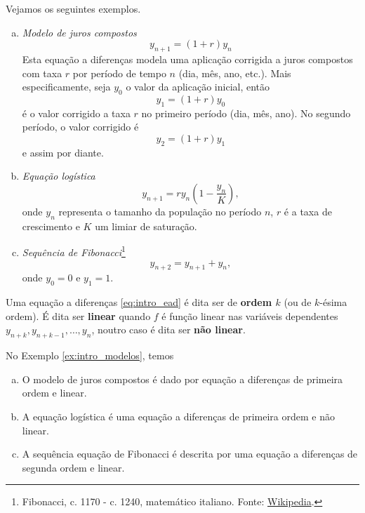 \begin{ex}\label{ex:intro_modelos}
  Vejamos os seguintes exemplos.
  \begin{enumerate}[a)]
  \item \emph{Modelo de juros compostos}
    \begin{equation}
      y_{n+1} = (1+r)y_n
    \end{equation}
    Esta equação a diferenças modela uma aplicação corrigida a juros compostos com taxa $r$ por período de tempo $n$ (dia, mês, ano, etc.). Mais especificamente, seja $y_0$ o valor da aplicação inicial, então
    \begin{equation}
      y_1 = (1+r)y_0
    \end{equation}
    é o valor corrigido a taxa $r$ no primeiro período (dia, mês, ano). No segundo período, o valor corrigido é
    \begin{equation}
      y_2 = (1+r)y_1
    \end{equation}
    e assim por diante.
  \item \emph{Equação logística}
    \begin{equation}
      y_{n+1} = r y_n\left(1 - \frac{y_n}{K}\right),
    \end{equation}
    onde $y_n$ representa o tamanho da população no período $n$, $r$ é a taxa de crescimento e $K$ um limiar de saturação.
  \item \emph{Sequência de Fibonacci}\footnote{Fibonacci, c. 1170 - c. 1240, matemático italiano. Fonte: \href{https://en.wikipedia.org/wiki/Fibonacci}{Wikipedia}.}
    \begin{equation}
      y_{n+2} = y_{n+1} + y_n,
    \end{equation}
    onde $y_0=0$ e $y_1=1$.
  \end{enumerate}
\end{ex}

Uma equação a diferenças \eqref{eq:intro_ead} é dita ser de {\bf ordem $k$} (ou de $k$-ésima ordem). É dita ser {\bf linear} quando $f$ é função linear nas variáveis dependentes $y_{n+k}, y_{n+k-1}, \dotsc, y_n$, noutro caso é dita ser {\bf não linear}.

\begin{ex}
  No Exemplo \ref{ex:intro_modelos}, temos
  \begin{enumerate}[a)]
  \item O modelo de juros compostos é dado por equação a diferenças de primeira ordem e linear.
  \item A equação logística é uma equação a diferenças de primeira ordem e não linear.
  \item A sequência equação de Fibonacci é descrita por uma equação a diferenças de segunda ordem e linear.
  \end{enumerate}
\end{ex}


